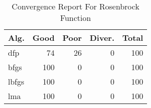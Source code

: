 \begin{table}
\centering
\caption{Convergence Report For Rosenbrock Function}
\label{convergence:rosenbrock2d}
\begin{tabular}{lrrrr}
\toprule
 Alg. &  Good &  Poor &  Diver. &  Total \\
\midrule
  dfp &    74 &    26 &       0 &    100 \\
 bfgs &   100 &     0 &       0 &    100 \\
lbfgs &   100 &     0 &       0 &    100 \\
  lma &   100 &     0 &       0 &    100 \\
\bottomrule
\end{tabular}
\end{table}
